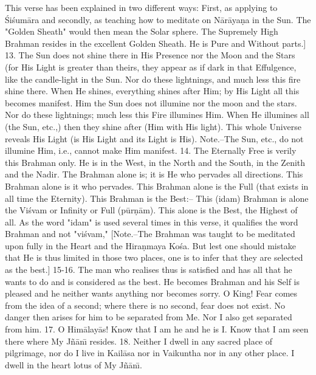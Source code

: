 This verse has been explained in two different ways: First, as applying to \'Si\'sum\=ara and secondly, as teaching how to meditate on N\=ar\=aya\d{n}a in the Sun. The "Golden Sheath" would then mean the Solar sphere. The Supremely High Brahman resides in the excellent Golden Sheath. He is Pure and Without parts.]
13. The Sun does not shine there in His Presence nor the Moon and the Stars (for His Light is greater than theirs, they appear as if dark in that Effulgence, like the candle-light in the Sun. Nor do these lightnings, and much less this fire shine there. When He shines, everything shines after Him; by His Light all this becomes manifest.
Him the Sun does not illumine nor the moon and the stars. Nor do these lightnings; much less this Fire illumines Him. When He illumines all (the Sun, etc.,) then they shine after (Him with His light). This whole Universe reveals His Light (is His Light and its Light is His). Note.--The Sun, etc., do not illumine Him, i.e., cannot make Him manifest.
14. The Eternally Free is verily this Brahman only. He is in the West, in the North and the South, in the Zenith and the Nadir. The Brahman alone is; it is He who pervades all directions. This Brahman alone is it who pervades. This Brahman alone is the Full (that exists in all time the Eternity). This Brahman is the Best:--
This (idam) Brahman is alone the Vi\'svam or Infinity or Full (p\=ur\d{n}\=am). This alone is the Best, the Highest of all. As the word "idam" is used several times in this verse, it qualifies the word Brahman and not "vi\'svam," [Note.--The Brahman was taught to be meditated upon fully in the Heart and the Hira\d{n}maya Ko\'sa. But lest one should mistake that He is thus limited in those two places, one is to infer that they are selected as the best.]
15-16. The man who realises thus is satisfied and has all that he wants to do and is considered as the best. He becomes Brahman and his Self is pleased and he neither wants anything nor becomes sorry. O King! Fear comes from the idea of a second; where there is no second, fear does not exist. No danger then arises for him to be separated from Me. Nor I also get separated from him.
17. O Him\=alay\=as! Know that I am he and he is I. Know that I am seen there where My J\~n\=an\={\i} resides.
18. Neither I dwell in any sacred place of pilgrimage, nor do I live in Kail\=asa nor in Vaikuntha nor in any other place. I dwell in the heart lotus of My J\~n\=an\={\i}.

